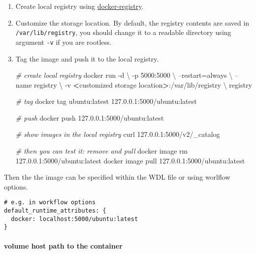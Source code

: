 \documentclass[
]{book}
\newenvironment{Shaded}{\begin{snugshade}}{\end{snugshade}}
\newcommand{\CommentTok}[1]{\textcolor[rgb]{0.56,0.35,0.01}{\textit{#1}}}
\newcommand{\ExtensionTok}[1]{#1}
\newcommand{\NormalTok}[1]{#1}
\newcommand{\OperatorTok}[1]{\textcolor[rgb]{0.81,0.36,0.00}{\textbf{#1}}}
\begin{document}
\begin{enumerate}
\def\labelenumi{\arabic{enumi}.}
\item
  Create local registry using
  \href{https://docs.docker.com/registry/}{docker-registry}.
\item
  Customize the storage location. By default, the registry contents are saved
  in \texttt{/var/lib/registry}, you should change it to a readable directory using argument \texttt{-v} if you are rootless.
\item
  Tag the image and push it to the local registry.

\begin{Shaded}
\begin{Highlighting}[]
\CommentTok{# create local registry}
\ExtensionTok{docker}\NormalTok{ run -d \textbackslash{}}
\NormalTok{  -p 5000:5000 \textbackslash{}}
\NormalTok{  --restart=always \textbackslash{}}
\NormalTok{  --name registry \textbackslash{}}
\NormalTok{  -v }\OperatorTok{<}\NormalTok{customized storage location}\OperatorTok{>}\NormalTok{:/var/lib/registry \textbackslash{}}
\NormalTok{  registry}

 \CommentTok{# tag}
 \ExtensionTok{docker}\NormalTok{ tag ubuntu:latest 127.0.0.1:5000/ubuntu:latest}

 \CommentTok{# push}
 \ExtensionTok{docker}\NormalTok{ push 127.0.0.1:5000/ubuntu:latest}

 \CommentTok{# show images in the local registry}
 \ExtensionTok{curl}\NormalTok{ 127.0.0.1:5000/v2/_catalog}

 \CommentTok{# then you can test it: remove and pull}
 \ExtensionTok{docker}\NormalTok{ image rm 127.0.0.1:5000/ubuntu:latest}
 \ExtensionTok{docker}\NormalTok{ image pull 127.0.0.1:5000/ubuntu:latest}
\end{Highlighting}
\end{Shaded}
\end{enumerate}

Then the the image can be specified within the WDL file or using worlflow
options.

\begin{verbatim}
# e.g. in workflow options
default_runtime_attributes: {
  docker: localhost:5000/ubuntu:latest
}
\end{verbatim}

\hypertarget{volume-host-path-to-the-container}{%
\paragraph{volume host path to the container}\label{volume-host-path-to-the-container}}
\end{document}
